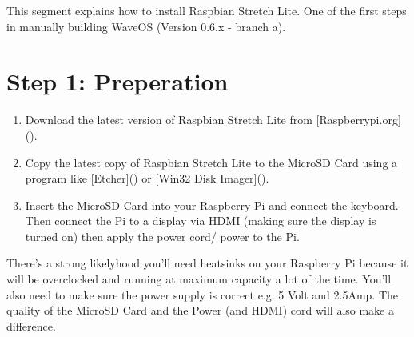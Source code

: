 \documentclass[letterpaper,10pt,openany,oneside,english]{sphinxmanual}
\begin{document}
This segment explains how to install Raspbian Stretch Lite.
One of the first steps in manually building WaveOS (Version 0.6.x - branch a).


\section{Step 1: Preperation}
\label{\detokenize{manual_build:step-1-preperation}}\begin{enumerate}
\item {} 
Download the latest version of Raspbian Stretch Lite from {[}Raspberrypi.org{]}().

\item {} 
Copy the latest copy of Raspbian Stretch Lite to the MicroSD Card using a program like {[}Etcher{]}() or {[}Win32 Disk Imager{]}().

\item {} 
Insert the MicroSD Card into your Raspberry Pi and connect the keyboard. Then connect the Pi to a display via HDMI (making sure the display is turned on) then apply the power cord/ power to the Pi.

\end{enumerate}

There’s a strong likelyhood you’ll need heatsinks on your Raspberry Pi because it will be overclocked and running at maximum capacity a lot of the time.
You’ll also need to make sure the power supply is correct e.g. 5 Volt and 2.5Amp. The quality of the MicroSD Card and the Power (and HDMI) cord will also make a difference.
\end{document}
